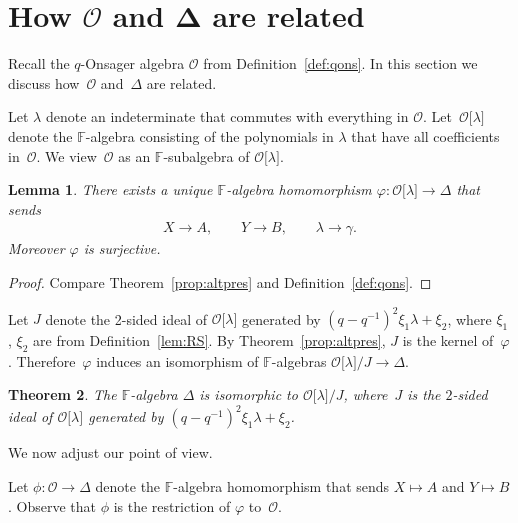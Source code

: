 \documentclass[pdftex]{sigma}
\numberwithin{equation}{section}
\newtheorem{Theorem}{Theorem}[section]
\newtheorem{Lemma}[Theorem]{Lemma}
\begin{document}
\section[How $\mathcal O$ and $\Delta$ are related]{How $\boldsymbol{\mathcal O}$ and $\boldsymbol{\Delta}$ are related}

 Recall the $q$-Onsager algebra $\mathcal O$
from Def\/inition~\ref{def:qons}. In this section we discuss how~$\mathcal O$ and~$\Delta$ are related.

\begin{Definition}  Let $\lambda $ denote
an indeterminate that commutes with
everything in $\mathcal O$.
Let~${\mathcal O}\lbrack \lambda \rbrack$
denote the $\mathbb F$-algebra consisting of
the polynomials in $\lambda $ that have all coef\/f\/icients
in~$\mathcal O$.
We view~$\mathcal O$ as an $\mathbb F$-subalgebra of
 ${\mathcal O}\lbrack \lambda \rbrack$.
\end{Definition}

\begin{Lemma}
\label{lem:varphi}
There exists a unique
$\mathbb F$-algebra
homomorphism $ \varphi: {\mathcal O}\lbrack \lambda \rbrack \to \Delta $
that sends
\begin{gather*}
X\to A, \qquad
Y\to B, \qquad
\lambda \to \gamma.
\end{gather*}
Moreover $\varphi$ is surjective.
\end{Lemma}

\begin{proof}
Compare
Theorem~\ref{prop:altpres} and
Def\/inition~\ref{def:qons}.
\end{proof}


Let $J$ denote the 2-sided ideal of
 ${\mathcal O}\lbrack \lambda \rbrack $
 generated by
$(q-q^{-1})^2\xi_1 \lambda +\xi_2$,
where $\xi_1$, $\xi_2$ are from
Def\/inition~\ref{lem:RS}.
By Theorem~\ref{prop:altpres},
$J$ is the
kernel of~$ \varphi$.
Therefore~$\varphi$ induces an isomorphism of
$\mathbb F$-algebras
${\mathcal O}\lbrack \lambda \rbrack /J
\to \Delta $.


\begin{Theorem}
\label{thm:97}
The $\mathbb F$-algebra $\Delta $ is isomorphic to
${\mathcal O}\lbrack \lambda \rbrack /J$,
where~$J$ is the $2$-sided ideal of
 ${\mathcal O}\lbrack \lambda \rbrack$
 generated by
$(q-q^{-1})^2\xi_1 \lambda +\xi_2$.
\end{Theorem}

 We now adjust our point of view.


\begin{Definition}
\label{def:hatvp}
Let $\phi: {\mathcal O} \to \Delta $
denote the $\mathbb F$-algebra homomorphism that sends
$X\mapsto A$ and $Y\mapsto B$. Observe that
$\phi$ is the restriction of
$ \varphi $ to~${\mathcal O}$.
\end{Definition}
\end{document}
